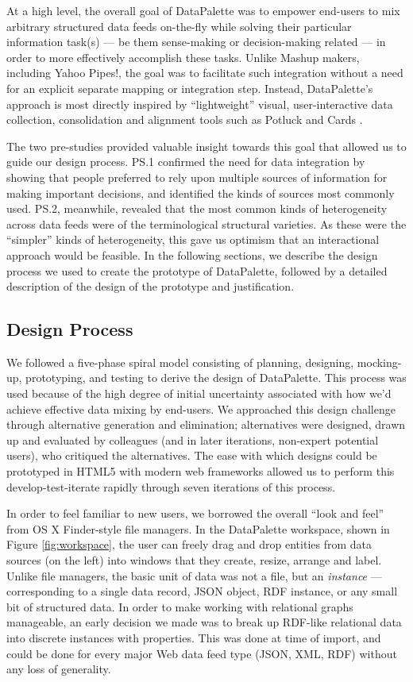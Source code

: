 \documentclass{sigchi}
\begin{document}
At a high level, the overall goal of DataPalette was to empower end-users to mix arbitrary structured data feeds on-the-fly while solving their particular information task(s) --- be them sense-making or decision-making related --- in order to more effectively accomplish these tasks.  Unlike Mashup makers, including Yahoo Pipes!, the goal was to facilitate such integration without a need for an explicit separate mapping or integration step.  Instead, DataPalette's approach is most directly inspired by ``lightweight'' visual, user-interactive data collection, consolidation and alignment tools such as Potluck \cite{citeulike:3875264} and Cards \cite{Dontcheva:2007:RCS:1294211.1294224}.

The two pre-studies provided valuable insight towards this goal that allowed us to guide our design process. PS.1 confirmed the need for data integration by showing that people preferred to rely upon multiple sources of information for making important decisions, and identified the kinds of sources most commonly used.  PS.2, meanwhile, revealed that the most common kinds of heterogeneity across data feeds were of the terminological structural varieties. As these were the ``simpler'' kinds of heterogeneity, this gave us optimism that an interactional approach would be feasible.  In the following sections, we describe the design process we used to create the prototype of DataPalette, followed by a detailed description of the design of the prototype and justification.

\subsection{Design Process}
We followed a five-phase spiral model consisting of planning, designing, mocking-up, prototyping, and testing to derive the design of DataPalette.  This process was used because of the high degree of initial uncertainty associated with how we'd achieve effective data mixing by end-users. We approached this design challenge through alternative generation and elimination; alternatives were designed, drawn up and evaluated by colleagues (and in later iterations, non-expert potential users), who critiqued the alternatives. The ease with which designs could be prototyped in HTML5 with modern web frameworks allowed us to perform this develop-test-iterate rapidly through seven iterations of this process.

In order to feel familiar to new users, we borrowed the overall  ``look and feel'' from OS X Finder-style file managers.  In the DataPalette workspace, shown in Figure \ref{fig:workspace}, the user can freely drag and drop entities from data sources (on the left) into windows that they create, resize, arrange and label. Unlike file managers, the basic unit of data was not a file, but an \emph{instance} --- corresponding to a single data record, JSON object, RDF instance, or any small bit of structured data. In order to make working with relational graphs manageable, an early decision we made was to break up RDF-like relational data into discrete instances with properties. This was done at time of import, and could be done for every major Web data feed type (JSON, XML, RDF) without any loss of generality.
\end{document}
